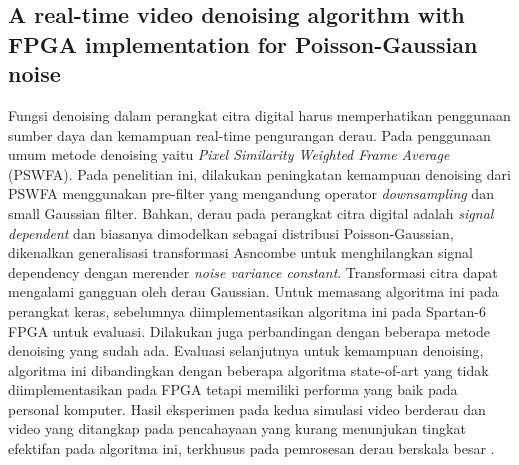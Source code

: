 \subsection{A real-time video denoising algorithm with FPGA implementation for Poisson-Gaussian noise}
Fungsi denoising dalam perangkat citra digital harus memperhatikan penggunaan sumber daya dan kemampuan real-time pengurangan derau. Pada penggunaan umum metode denoising yaitu \textit{Pixel Similarity Weighted Frame Average} (PSWFA). Pada penelitian ini, dilakukan peningkatan kemampuan denoising dari PSWFA menggunakan pre-filter yang mengandung operator \textit{downsampling} dan small Gaussian filter. Bahkan, derau pada perangkat citra digital adalah \textit{signal dependent} dan biasanya dimodelkan sebagai distribusi Poisson-Gaussian, dikenalkan generalisasi transformasi Asncombe untuk menghilangkan {signal dependency} dengan merender \textit{noise variance constant}. Transformasi citra dapat mengalami gangguan oleh derau Gaussian. Untuk memasang algoritma ini pada perangkat keras, sebelumnya diimplementasikan algoritma ini pada Spartan-6 FPGA untuk evaluasi. Dilakukan juga perbandingan dengan beberapa metode denoising yang sudah ada. Evaluasi selanjutnya untuk kemampuan denoising, algoritma ini dibandingkan dengan beberapa algoritma state-of-art yang tidak diimplementasikan pada FPGA tetapi memiliki performa yang baik pada personal komputer. Hasil eksperimen pada kedua simulasi video berderau dan video yang ditangkap pada pencahayaan yang kurang menunjukan tingkat efektifan pada algoritma ini, terkhusus pada pemrosesan derau berskala besar .

